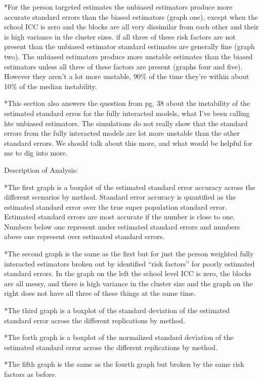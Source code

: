\documentclass[
]{article}
\begin{document}
*For the person targeted estimates the unbiased estimators produce more
accurate standard errors than the biased estimators (graph one), except
when the school ICC is zero and the blocks are all very dissimilar from
each other and their is high variance in the cluster sizes. if all three
of these risk factors are not present than the unbiased estimator
standard estimates are generally fine (graph two). The unbiased
estimators produce more unstable estimates than the biased estimators
unless all three of these factors are present (graphs four and five).
However they aren't a lot more unstable, 90\% of the time they're within
about 10\% of the median instability.

*This section also answers the question from pg. 38 about the
instability of the estimated standard erros for the fully interacted
models, what I've been calling hte unbiased estimators. The simulations
do not really show that the standard errors from the fully interacted
models are lot more unstable than the other standard errors. We should
talk about this more, and what would be helpful for me to dig into more.

Description of Analysis:

*The first graph is a boxplot of the estimated standard error accuracy
across the different scenarios by method. Standard error accuracy is
quantified as the estimated standard error over the true super
population standard error. Estimated standard errors are most accurate
if the number is close to one. Numbers below one represent under
estimated standard errors and numbers above one represent over estimated
standard errors.

*The second graph is the same as the first but for just the person
weighted fully interacted estimators broken out by identified ``risk
factors'' for poorly estimated standard errors. In the graph on the left
the school level ICC is zero, the blocks are all messy, and there is
high variance in the cluster size and the graph on the right does not
have all three of these things at the same time.

*The third graph is a boxplot of the standard deviation of the estimated
standard error across the different replications by method.

*The forth graph is a boxplot of the normalized standard deviation of
the estimated standard error across the different replications by
method.

*The fifth graph is the same as the fourth graph but broken by the same
risk factors as before.
\end{document}
